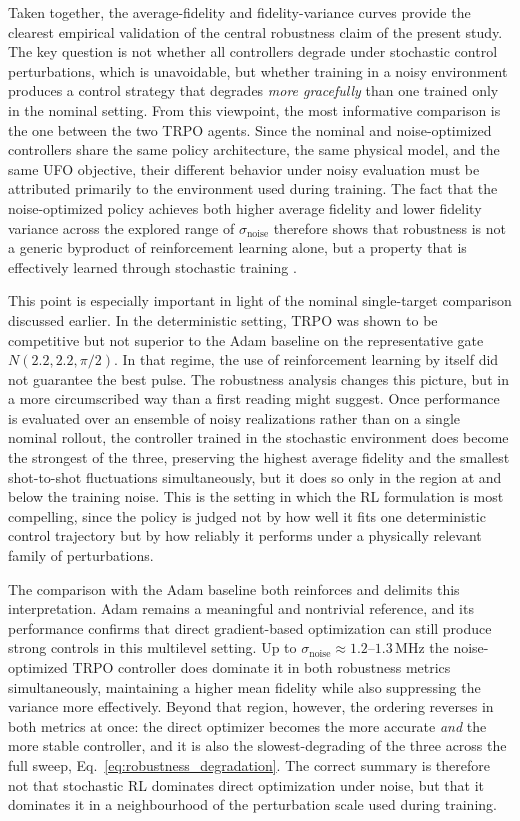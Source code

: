 Taken together, the average-fidelity and fidelity-variance curves provide the clearest empirical validation of the central robustness claim of the present study. The key question is not whether all controllers degrade under stochastic control perturbations, which is unavoidable, but whether training in a noisy environment produces a control strategy that degrades \emph{more gracefully} than one trained only in the nominal setting. From this viewpoint, the most informative comparison is the one between the two TRPO agents. Since the nominal and noise-optimized controllers share the same policy architecture, the same physical model, and the same UFO objective, their different behavior under noisy evaluation must be attributed primarily to the environment used during training. The fact that the noise-optimized policy achieves both higher average fidelity and lower fidelity variance across the explored range of \(\sigma_{\mathrm{noise}}\) therefore shows that robustness is not a generic byproduct of reinforcement learning alone, but a property that is effectively learned through stochastic training \cite{Niu2019}.

This point is especially important in light of the nominal single-target comparison discussed earlier. In the deterministic setting, TRPO was shown to be competitive but not superior to the Adam baseline on the representative gate \(N(2.2,2.2,\pi/2)\). In that regime, the use of reinforcement learning by itself did not guarantee the best pulse. The robustness analysis changes this picture, but in a more circumscribed way than a first reading might suggest. Once performance is evaluated over an ensemble of noisy realizations rather than on a single nominal rollout, the controller trained in the stochastic environment does become the strongest of the three, preserving the highest average fidelity and the smallest shot-to-shot fluctuations simultaneously, but it does so only in the region at and below the training noise. This is the setting in which the RL formulation is most compelling, since the policy is judged not by how well it fits one deterministic control trajectory but by how reliably it performs under a physically relevant family of perturbations.

The comparison with the Adam baseline both reinforces and delimits this interpretation. Adam remains a meaningful and nontrivial reference, and its performance confirms that direct gradient-based optimization can still produce strong controls in this multilevel setting. Up to \(\sigma_{\mathrm{noise}}\approx1.2\)--\(1.3\,\mathrm{MHz}\) the noise-optimized TRPO controller does dominate it in both robustness metrics simultaneously, maintaining a higher mean fidelity while also suppressing the variance more effectively. Beyond that region, however, the ordering reverses in both metrics at once: the direct optimizer becomes the more accurate \emph{and} the more stable controller, and it is also the slowest-degrading of the three across the full sweep, Eq.~\eqref{eq:robustness_degradation}. The correct summary is therefore not that stochastic RL dominates direct optimization under noise, but that it dominates it in a neighbourhood of the perturbation scale used during training.

